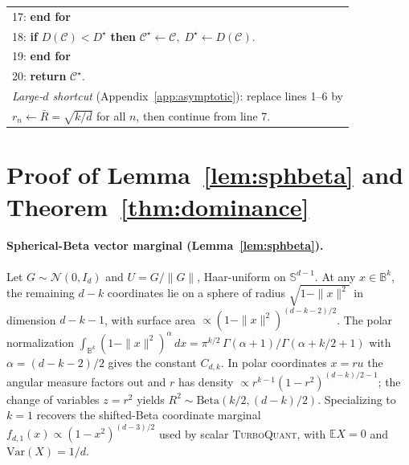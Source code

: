 \documentclass{article}
\theoremstyle{definition}
\theoremstyle{remark}
\newcommand{\bbS}{\mathbb{S}}
\newcommand{\bbB}{\mathbb{B}}
\begin{document}
\begin{table}[h]
\begin{center}
\begin{tabular}{l}
17: \quad \textbf{end for} \\
18: \quad \textbf{if} $D(\mathcal{C}) < D^\star$ \textbf{then}
$\mathcal{C}^\star \leftarrow \mathcal{C},\; D^\star \leftarrow D(\mathcal{C})$. \\
19: \textbf{end for} \\
20: \textbf{return} $\mathcal{C}^\star$. \\
\midrule
\emph{Large-$d$ shortcut} (Appendix~\ref{app:asymptotic}): replace
lines 1--6 by \\
$r_n \leftarrow \bar R = \sqrt{k/d}$ for all $n$, then continue from
line 7. \\
\bottomrule
\end{tabular}
\end{center}
\end{table}

\section{Proof of Lemma~\ref{lem:sphbeta} and Theorem~\ref{thm:dominance}}
\label{app:proofs}

\paragraph{Spherical-Beta vector marginal (Lemma~\ref{lem:sphbeta}).}
Let $G \sim \mathcal{N}(0, I_d)$ and $U = G / \|G\|$, Haar-uniform
on $\bbS^{d - 1}$.  At any $x \in \bbB^k$, the remaining $d - k$
coordinates lie on a sphere of radius $\sqrt{1 - \|x\|^2}$ in
dimension $d - k - 1$, with surface area
$\propto (1 - \|x\|^2)^{(d - k - 2)/2}$.  The polar normalization
$\int_{\bbB^k} (1 - \|x\|^2)^{\alpha}\, dx
= \pi^{k/2}\,\Gamma(\alpha + 1)/\Gamma(\alpha + k/2 + 1)$ with
$\alpha = (d - k - 2)/2$ gives the constant $C_{d, k}$.  In polar
coordinates $x = r u$ the angular measure factors out and $r$ has
density $\propto r^{k - 1}(1 - r^2)^{(d - k)/2 - 1}$; the change of
variables $z = r^2$ yields
$R^2 \sim \mathrm{Beta}(k/2, (d - k)/2)$.  Specializing to $k = 1$
recovers the shifted-Beta coordinate marginal
$f_{d, 1}(x) \propto (1 - x^2)^{(d - 3)/2}$ used by scalar
\textsc{TurboQuant}, with $\mathbb{E} X = 0$ and
$\mathrm{Var}(X) = 1/d$.
\end{document}
